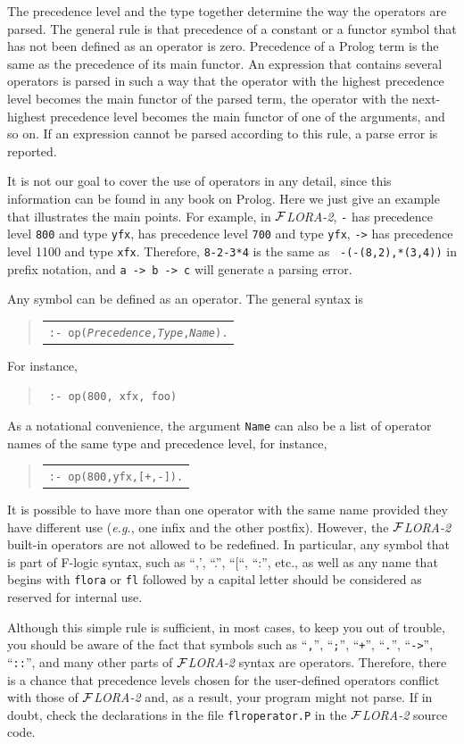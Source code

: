 \documentclass[11pt]{article}
\newenvironment{qrules}{\begin{quote}\tt\begin{tabular}[t]{l}}%
{\end{tabular}\end{quote}}
\newcommand{\FLORA}{{\mbox{${\cal F}${\small\it LORA}\rm\emph{-2}}}\xspace}
\newcommand{\fl}{\mbox{F-logic}\xspace}
\begin{document}
The precedence level and the type together determine the way the operators
are parsed. The general rule is that precedence of a constant or a functor
symbol that has not been defined as an operator is zero. Precedence of a
Prolog term is the same as the precedence of its main functor. 
An expression that contains several operators is parsed in such a way that
the operator with the highest precedence level becomes the main functor of
the parsed term, the operator with the next-highest precedence
level becomes the main functor of one of the arguments, and so on.
If an expression cannot be parsed according to this rule, a parse error is
reported.

It is not our goal to cover the use of operators in any detail, since this
information can be found in any book on Prolog. Here we just give an
example that illustrates the main points.  For example, in \FLORA, {\tt -}
has precedence level {\tt 800} and type {\tt yfx}, {\tt *} has precedence
level {\tt 700} and type {\tt yfx}, {\tt ->} has precedence level 1100 and
type {\tt xfx}.  Therefore, {\tt 8-2-3*4} is the same as {\tt
  -(-(8,2),*(3,4))} in prefix notation, and {\tt a -> b -> c} will generate
a parsing error.


%
Any symbol can be defined as an operator. The general syntax is
\begin{qrules}
{\tt :- op(\emph{Precedence},\emph{Type},\emph{Name}).}
\end{qrules}
For instance, 
\begin{quote}
 {\tt
   :- op(800, xfx, foo)
   }
\end{quote}
As a notational convenience, the argument {\tt Name} can also be a list of
operator names of the same type and precedence level, for instance,
\begin{qrules}
{\tt :- op(800,yfx,[+,-]).}
\end{qrules}
It is possible to have more than one operator with the same name provided
they have different use ({\it e.g.}, one infix and the other postfix).
However, the \FLORA built-in operators are not allowed to be redefined.
In particular, any symbol that is part of \fl syntax, such as ``,', ``.'',
``[``, ``:'', etc., as well as any name that begins with {\tt flora} or
{\tt fl} followed by a capital letter should be considered as reserved for
internal use.

Although this simple rule is sufficient, in most cases, to keep you out of
trouble, you should be aware of the fact that symbols such as ``{\tt ,}'',
``{\tt ;}'', ``{\tt +}'', ``{\tt .}'', ``{\tt ->}'', ``{\tt ::}'', and many
other parts of \FLORA syntax are operators. Therefore, there is a chance
that precedence levels chosen for the user-defined operators conflict with
those of \FLORA and, as a result, your program might not parse. If in
doubt, check the declarations in the file {\tt flroperator.P} in the \FLORA
source code.
\end{document}
